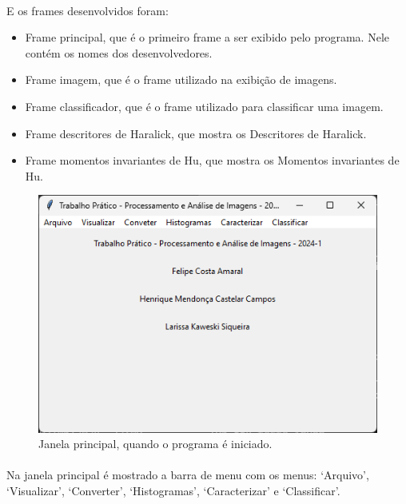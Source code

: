 \documentclass[12pt]{article}
\begin{document}
\paragraph{}E os frames desenvolvidos foram:

\begin{itemize}
    \item Frame principal, que é o primeiro frame a ser exibido pelo programa. Nele contém os nomes dos desenvolvedores.

    \item Frame imagem, que é o frame utilizado na exibição de imagens.

    \item Frame classificador, que é o frame utilizado para classificar uma imagem.

    \item Frame descritores de Haralick, que mostra os Descritores de Haralick.

    \item Frame momentos invariantes de Hu, que mostra os Momentos invariantes de Hu.
\end{itemize}

\begin{figure}
    \centering
    \includegraphics{Captura de tela 2024-06-10 094756.png}
    \caption{Janela principal, quando o programa é iniciado.}
    \label{fig:janela-principal}
\end{figure}

\paragraph{}Na janela principal é mostrado a barra de menu com os menus: ‘Arquivo’, ‘Visualizar’, ‘Converter’, ‘Histogramas’, ‘Caracterizar’ e ‘Classificar’.
\end{document}
